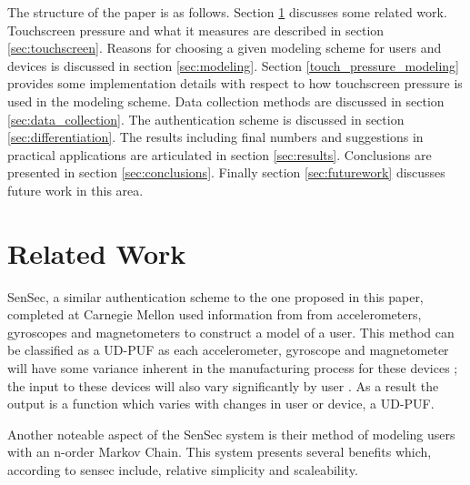 \documentclass{acm_proc_article-sp}
\begin{document}
The structure of the paper is as follows. Section \ref{sec:related_work} discusses some related work. Touchscreen pressure and what it measures are described in section \ref{sec:touchscreen}. Reasons for choosing a given modeling scheme for users and devices is discussed in section \ref{sec:modeling}. Section \ref{touch_pressure_modeling} provides some implementation details with respect to how touchscreen pressure is used in the modeling scheme. Data collection methods are discussed in section \ref{sec:data_collection}. The authentication scheme is discussed in section \ref{sec:differentiation}. The results including final numbers and suggestions in practical applications are articulated in section \ref{sec:results}. Conclusions are presented in section \ref{sec:conclusions}. Finally section \ref{sec:futurework} discusses future work in this area. 

\section{Related Work}
\label{sec:related_work}
SenSec, a similar authentication scheme to the one proposed in this paper, completed at Carnegie Mellon used information from from accelerometers, gyroscopes and magnetometers to construct a model of a user. \cite{zhu2013sensec} This method can be classified as a UD-PUF as each accelerometer, gyroscope and magnetometer will have some variance inherent in the manufacturing process for these devices \cite{?}; the input to these devices will also vary significantly by user \cite{?}. As a result the output is a function which varies with changes in user or device, a UD-PUF.

Another noteable aspect of the SenSec system is their method of modeling users with an n-order Markov Chain. This system presents several benefits which, according to sensec include, relative simplicity and scaleability. \cite{zhu2013sensec} 

\cite{shi2011senguard}
\cite{feng2012continuous}


\end{document}
